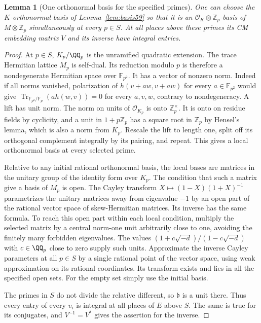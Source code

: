 \documentclass[a4paper,11pt]{article}
\newtheorem{lemma}[proposition]{Lemma}
\theoremstyle{definition}
\theoremstyle{remark}
\newcommand{\ZZ}{\mathbb Z}\newcommand{\ord}{\operatorname{ord}}
\numberwithin{equation}{section}
\begin{document}
\begin{lemma}[One orthonormal basis for the specified primes]\leavevmode\label{lem:basis63}
One can choose the \(K\)-orthonormal basis of Lemma~\ref{lem:basis59}
so that it is an \(\mathcal O_K\otimes\ZZ_p\)-basis of
\(M\otimes\ZZ_p\) simultaneously at every \(p\in S\).
At all places above these primes its CM embedding matrix \(V\)
and its inverse have integral entries.
\end{lemma}
\begin{proof}
At \(p\in S\), \(K_p/\QQ_p\) is the unramified quadratic
extension. The trace Hermitian lattice \(M_p\) is self-dual.
Its reduction modulo \(p\) is therefore a nondegenerate Hermitian
space over \(\mathbb F_{p^2}\). It has a vector of nonzero norm.
Indeed if all norms vanished, polarization of \(h(v+aw,v+aw)\)
for every \(a\in\mathbb F_{p^2}\) would give
\(\operatorname{Tr}_{\mathbb F_{p^2}/\mathbb F_p}(a h(w,v))=0\)
for every \(a,v,w\), contrary to nondegeneracy. A lift has unit
norm. The norm on units of \(\mathcal O_{K_p}\) is onto
\(\ZZ_p^\times\). It is onto on residue fields by cyclicity,
and a unit in \(1+p\ZZ_p\) has a square root in \(\ZZ_p\) by
Hensel's lemma, which is also a norm from \(K_p\).
Rescale the lift to length one, split off its orthogonal complement
integrally by its pairing, and repeat. This gives a local
orthonormal basis at every selected prime.

Relative to any initial rational orthonormal basis, the local bases
are matrices in the unitary group of the identity form over \(K_p\).
The condition that such a matrix give a basis of \(M_p\) is open.
The Cayley transform \(X\mapsto(1-X)(1+X)^{-1}\) parametrizes
the unitary matrices away from eigenvalue \(-1\) by an open part
of the rational vector space of skew-Hermitian matrices. Its
inverse has the same formula. To reach this open part within
each local condition, multiply the selected matrix by a central
norm-one unit arbitrarily close to one, avoiding the finitely
many forbidden eigenvalues. The values
\((1+c\sqrt{-d})/(1-c\sqrt{-d})\) with \(c\in\QQ_p\) close to
zero supply such units. Approximate the inverse Cayley parameters
at all \(p\in S\) by a single rational point of the vector space,
using weak approximation on its rational coordinates. Its
transform exists and lies in all the specified open sets.
For the empty set simply use the initial basis.

The primes in \(S\) do not divide the relative different, so
\(\mathfrak b\) is a unit there. Thus every entry of every \(v_i\)
is integral at all places of \(E\) above \(S\). The same is
true for its conjugates, and \(V^{-1}=V^*\) gives the assertion
for the inverse.
\end{proof}
\end{document}
